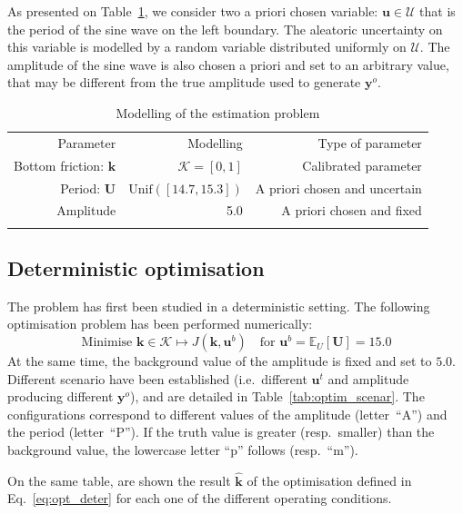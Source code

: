 \documentclass[npg, manuscript]{copernicus}
\newcommand{\Ex}{\mathbb{E}}
\begin{document}
As presented on Table~\ref{tab:RO_modelling}, we consider two a priori chosen variable: $\mathbf{u} \in \mathcal{U}$ that is the period of the sine wave on the left boundary. The aleatoric uncertainty on this variable is modelled by a random variable distributed uniformly on $\mathcal{U}$.
The amplitude of the sine wave is also chosen a priori and set to an arbitrary value, that may be different from the true amplitude used to generate $\mathbf{y}^o$. 



\begin{table}[!h]
  \caption{Modelling of the estimation problem}
  \label{tab:RO_modelling}
\begin{tabular}{rrr}
  \tophline
  Parameter & Modelling & Type of parameter \\
  \middlehline
  Bottom friction: $\mathbf{k}$  &$\mathcal{K}=[0, 1]$ & Calibrated parameter \\
  Period: $\mathbf{U}$ & $\mathrm{Unif}\left([14.7, 15.3]\right)$ & A priori chosen and uncertain\\
  Amplitude &  5.0 & A priori chosen and fixed\\
  \bottomhline
\end{tabular}
\end{table}

\subsection{Deterministic optimisation}
\label{ssec:deterministic_optimisation}
The problem has first been studied in a deterministic setting. The following optimisation problem has been performed numerically:
\begin{equation}
  \label{eq:opt_deter}
  \text{Minimise } \mathbf{k}\in\mathcal{K} \mapsto J(\mathbf{k},\mathbf{u}^b)\quad \text{for }\mathbf{u}^b= \Ex_U[\mathbf{U}] = 15.0
\end{equation}
At the same time, the background value of the amplitude is fixed and set to $5.0$.
Different scenario have been established (i.e.\ different $\mathbf{u}^t$ and amplitude producing different $\mathbf{y}^o$), and are detailed in Table~\ref{tab:optim_scenar}. The configurations correspond to different values of the amplitude (letter~``A'') and the period (letter~``P''). If the truth value is greater (resp.\ smaller) than the background value, the lowercase letter ``p'' follows (resp.\ ``m'').

On the same table, are shown the result $\hat{\mathbf{k}}$ of the optimisation defined in Eq.~\eqref{eq:opt_deter} for each one of the different operating conditions.
\end{document}
